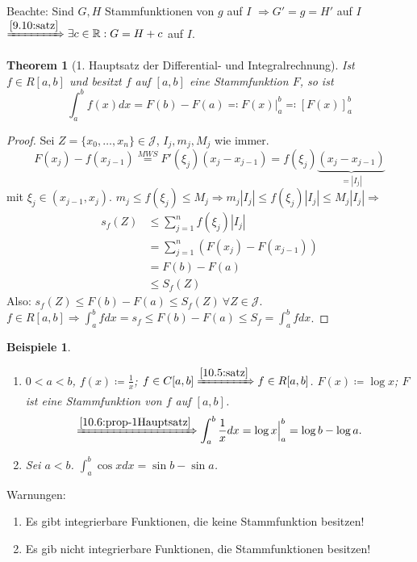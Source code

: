 \documentclass[14pt,titlepage,ngerman,a4paper,headsepline,DIV15,halfparskip*]{scrartcl}
\newcommand{\R}{\mathbb{R}}
\theoremstyle{named}
\newtheorem{namedtheorem}{Theorem} \counterwithin{namedtheorem}{section}
\theoremstyle{dotless}
\newtheorem*{beispiele}{Beispiele}
\begin{document}
Beachte: Sind $G, H$ Stammfunktionen von $g$ auf $I$ $\Rightarrow G' = g = H'$ auf $I$ $\xRightarrow[]{\ref{9.10:satz}} \exists c \in \R: G = H + c$ auf $I$.

\begin{namedtheorem}[1. Hauptsatz der Differential- und Integralrechnung]\label{10.6:prop-1Hauptsatz}
	Ist $f \in R[a, b]$ und besitzt $f$ auf $[a, b]$ eine Stammfunktion $F$, so ist 
	$$ \int_{a}^{b} f(x) dx = F(b) - F(a) \eqqcolon F(x) \Big|_{a}^{b} \eqqcolon \left[ F(x) \right]_{a}^{b} $$
\end{namedtheorem}

\begin{proof}
	Sei $Z = \{ x_{0}, \dotsc, x_{n} \} \in \mathcal{J}$, $I_{j}, m_{j}, M_{j}$ wie immer.
	$$ F(x_{j}) - f(x_{j-1}) \overset{\hyperref[9.7:prop-Mittelwertsatz]{MWS}}{=} F'(\xi_{j}) (x_{j} - x_{j-1}) = f(\xi_{j}) \underbrace{(x_{j} - x_{j-1})}_{ = |I_{j}|} $$
	mit $\xi_{j} \in (x_{j-1}, x_{j})$. $m_{j} \leq f(\xi_{j}) \leq M_{j} \Rightarrow m_{j} |I_{j}| \leq f(\xi_{j}) |I_{j}| \leq M_{j} |I_{j}| \Rightarrow$
	\begin{align*}
		s_{f}(Z) & \leq \sum_{j=1}^{n} f(\xi_{j}) |I_{j}| \\
			& = \sum_{j=1}^{n} \left( F(x_{j}) - F(x_{j-1}) \right) \\
			& = F(b) - F(a)  \\
			& \leq S_{f}(Z)
	\end{align*}
	Also: $s_{f}(Z) \leq F(b) - F(a) \leq S_{f}(Z) ~\forall Z \in \mathcal{J}$. \\
	$f \in R[a, b] \Rightarrow \int_{a}^{b} f dx = s_{f} \leq F(b) - F(a) \leq S_{f} = \int_{a}^{b} f dx$.
\end{proof}


\begin{beispiele} ~\
	\begin{enumerate}
		\item $0 < a < b$, $f(x) \coloneqq \frac{1}{x}$; $f \in C[a, b] \xRightarrow[]{\ref{10.5:satz}} f \in R[a, b]$. $F(x) \coloneqq \log x$; $F$ ist eine Stammfunktion von $f$ auf $[a, b]$.
			$$ \xRightarrow[]{\ref{10.6:prop-1Hauptsatz}} \int_{a}^{b} \frac{1}{x} dx = \log x \Big|_{a}^{b} = \log b - \log a. $$
		\item Sei $a < b$. $\int_{a}^{b} \cos x dx = \sin b - \sin a$.
	\end{enumerate}
\end{beispiele}

Warnungen:
\begin{enumerate}
	\item Es gibt integrierbare Funktionen, die keine Stammfunktion besitzen!
	\item Es gib nicht integrierbare Funktionen, die Stammfunktionen besitzen!
\end{enumerate}
\end{document}

